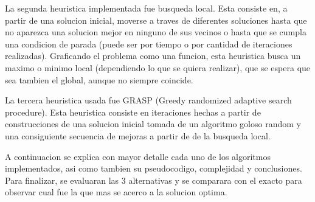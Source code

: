La segunda heuristica implementada fue busqueda local. Esta consiste en, a partir de una solucion inicial, moverse a traves de diferentes soluciones hasta
que no aparezca una solucion mejor en ninguno de sus vecinos o hasta que se cumpla una condicion de parada (puede ser por tiempo o por cantidad de iteraciones
realizadas).
Graficando el problema como una funcion, esta heuristica busca un maximo o minimo local (dependiendo lo que se quiera realizar), que se espera que sea tambien
el global, aunque no siempre coincide.


La tercera heuristica usada fue GRASP (Greedy randomized adaptive search procedure). Esta heuristica consiste en iteraciones hechas a partir de  construcciones
de una solucion inicial tomada de un algoritmo goloso random y una consiguiente secuencia de mejoras a partir de de la busqueda local.


A continuacion se explica con mayor detalle cada uno de los algoritmos implementados, asi como tambien su pseudocodigo, complejidad y conclusiones.
Para finalizar, se evaluaran las 3 alternativas y se comparara con el exacto para observar cual fue la que mas se acerco a la solucion optima.
